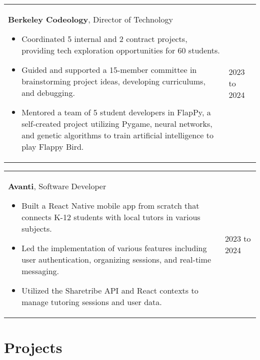 \documentclass[10pt, a4paper]{article}
\newenvironment{highlights}{
        \begin{itemize}[
                topsep=0pt,
                parsep=0.10 cm,
                partopsep=0pt,
                itemsep=0pt,
                after=\vspace{-1\baselineskip},
                leftmargin=0.4 cm + 3pt
            ]
    }{
        \end{itemize}
    } %
\begin{document}
        \vspace{0.12 cm}
        \begin{tabularx}{ cm-0.13cm}{K{0.2 cm} R{4.1 cm}}
            \textbf{Berkeley Codeology}, Director of Technology
            \vspace{0.10 cm}
            \begin{highlights}
                \item Coordinated 5 internal and 2 contract projects, providing tech exploration opportunities for 60 students. 
                \item Guided and supported a 15-member committee in brainstorming project ideas, developing curriculums, and debugging. 
                \item Mentored a team of 5 student developers in FlapPy, a self-created project utilizing Pygame, neural networks, and genetic algorithms to train artificial intelligence to play Flappy Bird. \hspace*{-0.2cm}
            \end{highlights}
        &
            2023 to 2024
        \end{tabularx}

        \vspace{0.12 cm}
        \begin{tabularx}{ cm-0.13cm}{K{0.2 cm} R{4.1 cm}}
            \textbf{Avanti}, Software Developer
            \vspace{0.10 cm}
            \begin{highlights}
                \item Built a React Native mobile app from scratch that connects K-12 students with local tutors in various subjects. 
                \item Led the implementation of various features including user authentication, organizing sessions, and real-time messaging. 
                \item Utilized the Sharetribe API and React contexts to manage tutoring sessions and user data. \hspace*{-0.2cm}
            \end{highlights}
        &
            2023 to 2024
        \end{tabularx}



    \section{Projects}
    
\end{document}
